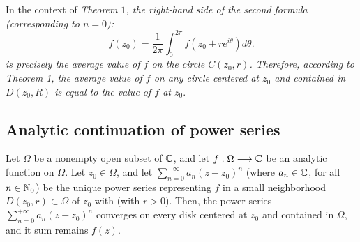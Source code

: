 \begin{remark}
  In the context of \it Theorem $1$\normalfont, the right-hand side of the second formula (corresponding 
  to $n = 0$):
  \[
  f(z_0)  = \frac{1}{2 \pi }
  \int_{0}^{2\pi } 
  f(z_0 + r e^{i \theta}) d \theta.
  \]
  is precisely the average value of $f$ on the circle $C(z_0, r) $. Therefore, according to 
  \it Theorem 1\normalfont, the average value of $f$ on any circle centered at $z_0$ and
  contained in $D(z_0, R) $ is equal to the value of $f$ at $z_0.$ 
\end{remark}
\subsection{Analytic continuation of power series}
\newpage
\begin{theorem}[]
Let $\Omega$ be a nonempty open subset of $\mathbb{C} $, and let $ f : \Omega  \longrightarrow \mathbb{C}  $ 
be an analytic function on $\Omega$. Let $z_0 \in  \Omega$, and let 
$\sum_{n=0}^{+\infty} a_n (z-z_0) ^n $ (where $a_n \in  \mathbb{C} $, for all $n \in  \mathbb{N}_0$) be the 
unique power series representing $f$ in a small neighborhood 
$D(z_0, r) \subset  \Omega$  of $z_0$ with (with $r > 0$). Then, the power series
$\sum_{n=0}^{+\infty} a_n (z-z_0) ^n $ converges on every disk centered at $z_0$ and contained in $\Omega$, 
and it sum remains $f(z).$ 
\end{theorem}
